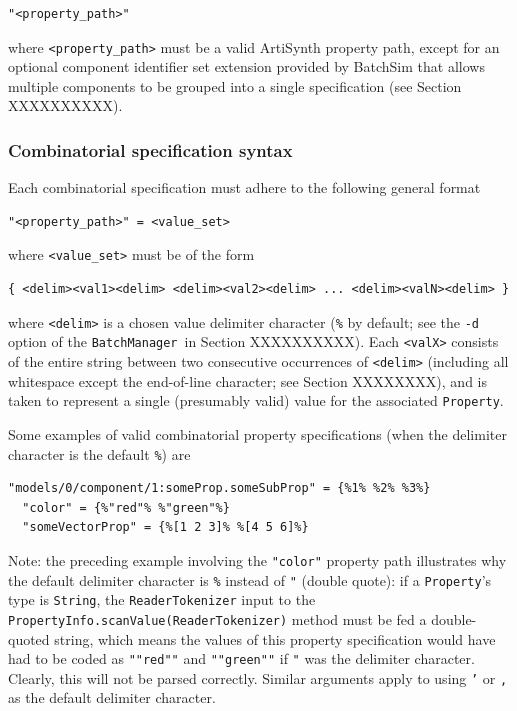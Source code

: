 \documentclass{article}
\newcommand{\BM}{{\tt BatchManager}}
\begin{document}
\begin{lstlisting}[]
  "<property_path>"
\end{lstlisting}

where {\tt <property\_path>} must be a valid ArtiSynth property path, except for an optional component identifier set extension provided by BatchSim that allows multiple components to be grouped into a single specification (see Section XXXXXXXXXX).

\subsubsection{Combinatorial specification syntax}

Each combinatorial specification must adhere to the following general format

\begin{lstlisting}[]
  "<property_path>" = <value_set>
\end{lstlisting}

where {\tt <value\_set>} must be of the form

\begin{lstlisting}[]
   { <delim><val1><delim> <delim><val2><delim> ... <delim><valN><delim> }
\end{lstlisting}

where {\tt <delim>} is a chosen value delimiter character ({\tt \%} by default; see the {\tt -d} option of the \BM\ in Section XXXXXXXXXX). Each {\tt <valX>} consists of the entire string between two consecutive occurrences of {\tt <delim>} (including all whitespace except the end-of-line character; see Section XXXXXXXX), and is taken to represent a single (presumably valid) value for the associated {\tt Property}.

Some examples of valid combinatorial property specifications (when the delimiter character is the default {\tt \%}) are

\begin{lstlisting}[]
  "models/0/component/1:someProp.someSubProp" = {%1% %2% %3%}
  "color" = {%"red"% %"green"%}
  "someVectorProp" = {%[1 2 3]% %[4 5 6]%}
\end{lstlisting}

\begin{sideblock}
Note: the preceding example involving the {\tt "color"} property path illustrates why the default delimiter character is {\tt \%} instead of {\tt "} (double quote): if a {\tt Property}'s type is {\tt String}, the {\tt ReaderTokenizer} input to the {\tt PropertyInfo.scanValue(ReaderTokenizer)} method must be fed a double-quoted string, which means the values of this property specification would have had to be coded as {\tt ""red""} and {\tt ""green""} if {\tt "} was the delimiter character. Clearly, this will not be parsed correctly. Similar arguments apply to using {\tt '} or {\tt ,} as the default delimiter character.
\end{sideblock}
\end{document}
